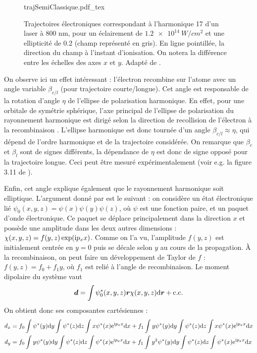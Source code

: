 \begin{figure}[!ht]
\centering
\def\svgwidth{0.7\columnwidth}
{trajSemiClassique.pdf_tex}
\caption{Trajectoires électroniques correspondant à l’harmonique 17 d'un laser à 800 nm, pour un éclairement de $\SI{1.2e14}{W/cm^2}$ et une ellipticité de 0.2 (champ représenté en gris).
En ligne pointillée, la direction du champ à l’instant d’ionisation. On notera la différence entre les échelles
des axes $x$ et $y$. Adapté de .}
\label{fig:ellhiguet}
\end{figure}

On observe ici un effet intéressant : l'électron recombine sur l'atome avec un angle variable $\beta_{c/l}$ (pour trajectoire courte/longue). Cet angle est responsable de la rotation d'angle $\eta$ de l'ellipse de polarisation harmonique. En effet, pour une orbitale de symétrie sphérique, l'axe principal de l'ellipse de polarisation du rayonnement harmonique est dirigé selon la direction de recollision de l'électron à la recombinaison . L'ellipse harmonique est donc tournée d'un angle $\beta_{c/l}\approx\eta$, qui dépend de l'ordre harmonique et de la trajectoire considérée. On remarque que $\beta_c$ et $\beta_l$ sont de signes différents, la dépendance de $\eta$ est donc de signe opposé pour la trajectoire longue. Ceci peut être mesuré expérimentalement (voir e.g. la figure 3.11 de ).\par
Enfin, cet angle explique également que le rayonnement harmonique soit elliptique. L'argument donné par  est le suivant : on considère un état électronique lié $\psi_0(x,y,z) = \psi(x)\psi(y)\psi(z)$, où $\psi$ est une fonction paire, et un paquet d'onde électronique. Ce paquet se déplace principalement dans la direction $x$ et possède une amplitude dans les deux autres dimensions : $\chi(x,y,z) = f(y,z)\exp(\mathrm{i} p_x x)$. Comme on l'a vu, l'amplitude $f(y,z)$ est initialement centrée en $y=0$ puis se décale selon $y$ au cours de la propagation. \`{A} la recombinaison, on peut faire un développement de Taylor de $f$ : $f(y,z) = f_0 + f_1 y$, où $f_1$ est relié à l'angle de recombinaison. Le moment dipolaire du système vaut 
\[\bm{d} = \int{\psi_0^*(x,y,z) \bm{r} \chi(x,y,z) \mathrm{d}\bm{r}} + \text{c.c.}\]
On obtient donc ses composantes cartésiennes :
\begin{align}
d_x &= f_0\int{\psi^*(y)\mathrm{d}y}\int{\psi^*(z)\mathrm{d}z}\int{x\psi^*(x)\mathrm{e}^{\mathrm{i}p_x x}\mathrm{d}x} + 
f_1\int{y \psi^*(y)\mathrm{d}y}\int{\psi^*(z)\mathrm{d}z}\int{x\psi^*(x)\mathrm{e}^{\mathrm{i}p_x x}\mathrm{d}x}\nonumber\\
d_y &= f_0\int{y \psi^*(y)\mathrm{d}y}\int{\psi^*(z)\mathrm{d}z}\int{\psi^*(x)\mathrm{e}^{\mathrm{i}p_x x}\mathrm{d}x} + 
f_1\int{y^2 \psi^*(y)\mathrm{d}y}\int{\psi^*(z)\mathrm{d}z}\int{\psi^*(x)\mathrm{e}^{\mathrm{i}p_x x}\mathrm{d}x}
\end{align}
